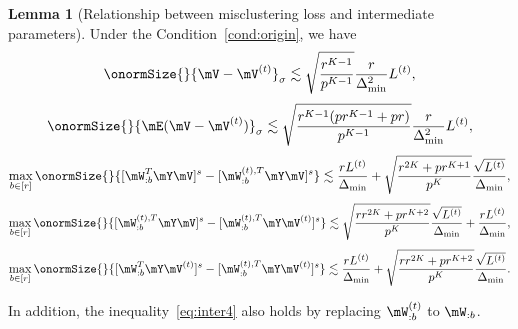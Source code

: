 \documentclass[lettersize,onecolumn,journal]{IEEEtran}
\theoremstyle{definition}
\newtheorem{lem}{Lemma}
\theoremstyle{definition}
\begin{document}
     \begin{lem}[Relationship between misclustering loss and intermediate parameters]\label{lem:intermediate} Under the Condition~\ref{cond:origin}, we have
    \begin{equation}\label{eq:inter1}
        \onormSize{}{\mV - \mV^{(t)}}_{\sigma} \lesssim \sqrt{\frac{r^{K-1}}{p^{K-1}}}  \frac{r}{\Delta_{\min}^2} L^{(t)},
    \end{equation}
    \begin{equation}\label{eq:inter2}
        \onormSize{}{\mE (\mV - \mV^{(t)})}_{\sigma} \lesssim \sqrt{ \frac{r^{K-1}(p r^{K-1} + p r)}{p^{K-1}}} 
 \frac{r}{\Delta_{\min}^2} L^{(t)},
 \end{equation}
 \begin{equation}\label{eq:inter3}
     \max_{b \in [r]} \onormSize{}{ [ \mW_{:b}^T \mY \mV ]^s   -  [ \mW_{:b}^{(t), T} \mY \mV  ]^s } \lesssim \frac{r L^{(t)}}{\Delta_{\min}} + \sqrt{ \frac{r^{2K} + pr^{K+1}}{p^{K}} } \frac{\sqrt{L^{(t)}}}{\Delta_{\min}},
 \end{equation}
 \begin{equation}\label{eq:inter4}
     \max_{b \in [r]} \onormSize{}{  [  \mW_{:b}^{(t), T}  \mY \mV]^s - [  \mW_{:b}^{(t), T}  \mY \mV^{(t)}]^s } \lesssim  \sqrt{ \frac{rr^{2K} + p r^{K+2}}{p^{K}}}  \frac{\sqrt{L^{(t)}}}{\Delta_{\min}} +  \frac{r L^{(t)}}{\Delta_{\min}},
     \end{equation}
    \begin{equation}\label{eq:inter5}
         \max_{b \in [r]} \onormSize{}{ [\mW_{:b}^T \mY \mV^{(t)} ]^s   -  [ \mW_{:b}^{(t), T} \mY \mV^{(t)} ]^s } \lesssim \frac{rL^{(t)}}{\Delta_{\min}} + \sqrt{ \frac{rr^{2K} + p r^{K+2}}{p^{K}}}  \frac{\sqrt{L^{(t)}}}{\Delta_{\min}}.
    \end{equation}
    
    In addition, the inequality~\eqref{eq:inter4} also holds by replacing $\mW_{:b}^{(t)}$ to $\mW_{:b}$.
    \end{lem}
        
\end{document}
